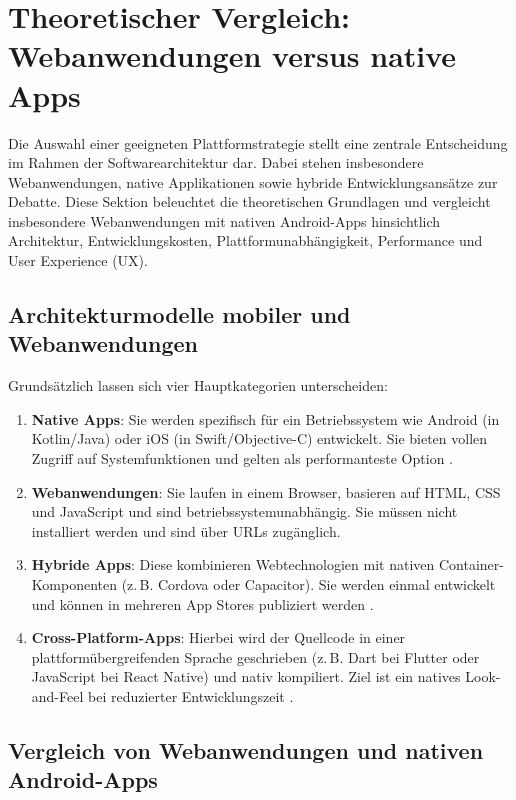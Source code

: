 \section{Theoretischer Vergleich: Webanwendungen versus native Apps}
\label{sec:vergleich-webapp-native}

Die Auswahl einer geeigneten Plattformstrategie stellt eine zentrale Entscheidung im Rahmen der Softwarearchitektur dar. Dabei stehen insbesondere Webanwendungen, native Applikationen sowie hybride Entwicklungsansätze zur Debatte. Diese Sektion beleuchtet die theoretischen Grundlagen und vergleicht insbesondere Webanwendungen mit nativen Android-Apps hinsichtlich Architektur, Entwicklungskosten, Plattformunabhängigkeit, Performance und User Experience (UX).

\subsection{Architekturmodelle mobiler und Webanwendungen}

Grundsätzlich lassen sich vier Hauptkategorien unterscheiden:
\begin{enumerate}
	\item \textbf{Native Apps}: Sie werden spezifisch für ein Betriebssystem wie Android (in Kotlin/Java) oder iOS (in Swift/Objective-C) entwickelt. Sie bieten vollen Zugriff auf Systemfunktionen und gelten als performanteste Option \cite{Charland2011}.
	\item \textbf{Webanwendungen}: Sie laufen in einem Browser, basieren auf HTML, CSS und JavaScript und sind betriebssystemunabhängig. Sie müssen nicht installiert werden und sind über URLs zugänglich.
	\item \textbf{Hybride Apps}: Diese kombinieren Webtechnologien mit nativen Container-Komponenten (z.\,B. Cordova oder Capacitor). Sie werden einmal entwickelt und können in mehreren App Stores publiziert werden \cite{Charland2011}.
	\item \textbf{Cross-Platform-Apps}: Hierbei wird der Quellcode in einer plattformübergreifenden Sprache geschrieben (z.\,B. Dart bei Flutter oder JavaScript bei React Native) und nativ kompiliert. Ziel ist ein natives Look-and-Feel bei reduzierter Entwicklungszeit \cite{Mahendra2021}.
\end{enumerate}

\subsection{Vergleich von Webanwendungen und nativen Android-Apps}

